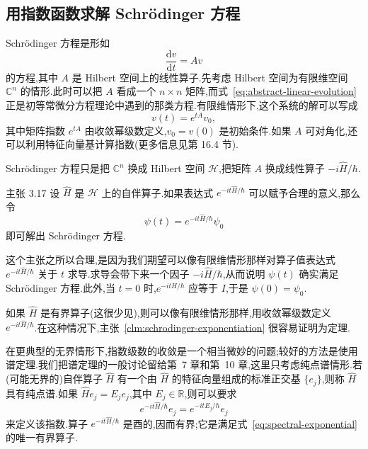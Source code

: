 \subsection{用指数函数求解 Schrödinger 方程}\label{subsec:schrodinger-exponentiation}

Schrödinger 方程是形如
\begin{equation}
\frac{\mathrm{d}v}{\mathrm{d}t}=Av
\label{eq:abstract-linear-evolution}
\end{equation}
的方程,其中 \(A\) 是 Hilbert 空间上的线性算子.先考虑 Hilbert 空间为有限维空间 \(\mathbb{C}^{n}\) 的情形.此时可以把 \(A\) 看成一个 \(n\times n\) 矩阵,而式~\eqref{eq:abstract-linear-evolution} 正是初等常微分方程理论中遇到的那类方程.有限维情形下,这个系统的解可以写成
\[
v(t)=e^{tA}v_{0},
\]
其中矩阵指数 \(e^{tA}\) 由收敛幂级数定义,\(v_{0}=v(0)\) 是初始条件.如果 \(A\) 可对角化,还可以利用特征向量基计算指数(更多信息见第 16.4 节).

Schrödinger 方程只是把 \(\mathbb{C}^{n}\) 换成 Hilbert 空间 \(\mathcal{H}\),把矩阵 \(A\) 换成线性算子 \(-i\widehat H/\hbar\).

\begin{custom}{主张 3.17}
\label{clm:schrodinger-exponentiation}
设 \(\widehat H\) 是 \(\mathcal{H}\) 上的自伴算子.如果表达式 \(e^{-it\widehat H/\hbar}\) 可以赋予合理的意义,那么令
\begin{equation}
\psi(t)=e^{-it\widehat H/\hbar}\psi_{0}
\label{eq:schrodinger-exponential-solution}
\end{equation}
即可解出 Schrödinger 方程.
\end{custom}

这个主张之所以合理,是因为我们期望可以像有限维情形那样对算子值表达式 \(e^{-it\widehat H/\hbar}\) 关于 \(t\) 求导.求导会带下来一个因子 \(-i\widehat H/\hbar\),从而说明 \(\psi(t)\) 确实满足 Schrödinger 方程.此外,当 \(t=0\) 时,\(e^{-it\widehat H/\hbar}\) 应等于 \(I\),于是 \(\psi(0)=\psi_{0}\).

如果 \(\widehat H\) 是有界算子(这很少见),则可以像有限维情形那样,用收敛幂级数定义 \(e^{-it\widehat H/\hbar}\).在这种情况下,主张~\ref{clm:schrodinger-exponentiation} 很容易证明为定理.

在更典型的无界情形下,指数级数的收敛是一个相当微妙的问题;较好的方法是使用谱定理.我们把谱定理的一般讨论留给第~7 章和第~10 章,这里只考虑纯点谱情形.若(可能无界的)自伴算子 \(\widehat H\) 有一个由 \(\widehat H\) 的特征向量组成的标准正交基 \(\{e_{j}\}\),则称 \(\widehat H\) 具有纯点谱.如果 \(\widehat He_{j}=E_{j}e_{j}\),其中 \(E_{j}\in\mathbb{R}\),则可以要求
\begin{equation}
e^{-it\widehat H/\hbar}e_{j}
=e^{-itE_{j}/\hbar}e_{j}
\label{eq:spectral-exponential}
\end{equation}
来定义该指数.算子 \(e^{-it\widehat H/\hbar}\) 是酉的,因而有界;它是满足式~\eqref{eq:spectral-exponential} 的唯一有界算子.

